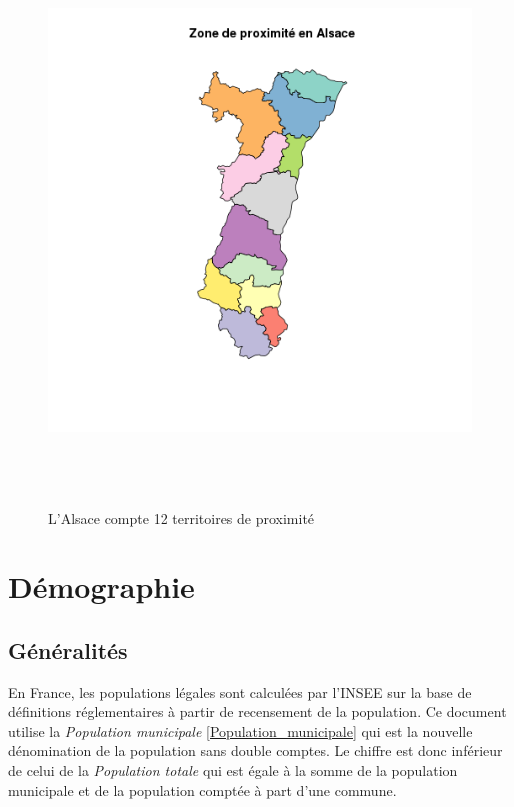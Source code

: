 \documentclass[12pt,english,french,twoside]{report}\usepackage[]{graphicx}\usepackage[]{color}
\begin{document}
\begin{figure}[ht]
 \centering
 \includegraphics[height=15cm,keepaspectratio=true]{../figure/zone_proximite.png}
 \caption{L'Alsace compte 12 territoires de proximité}
 \label{fig:zp}
\end{figure}

\section{Démographie}
\subsection{Généralités}

En France, les populations légales sont calculées par l'INSEE sur la base de définitions réglementaires à partir de recensement de la population. Ce document utilise la \emph{Population municipale} \ref{Population_municipale}   qui est la nouvelle dénomination de la population sans double comptes. Le chiffre est donc inférieur de celui de la \emph{Population totale} qui est égale à la somme de la population municipale et de la population comptée à part d'une commune.
\end{document}

